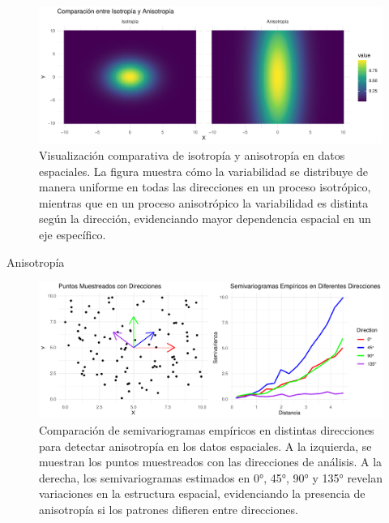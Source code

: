 \documentclass[
  10pt,
  ignorenonframetext,
]{beamer}
\begin{document}
\begin{frame}
\begin{figure}

{\centering \includegraphics{imagenes/anisotropia-1} 

}

\caption{Visualización comparativa de isotropía y anisotropía en datos espaciales. La figura muestra cómo la variabilidad se distribuye de manera uniforme en todas las direcciones en un proceso isotrópico, mientras que en un proceso anisotrópico la variabilidad es distinta según la dirección, evidenciando mayor dependencia espacial en un eje específico.}\label{fig:anisotropia}
\end{figure}
\end{frame}

\begin{frame}
\begin{block}{Anisotropía}
\label{anisotropuxeda}
\begin{figure}

{\centering \includegraphics{imagenes/unnamed-chunk-5-1} 

}

\caption{Comparación de semivariogramas empíricos en distintas direcciones para detectar anisotropía en los datos espaciales. A la izquierda, se muestran los puntos muestreados con las direcciones de análisis. A la derecha, los semivariogramas estimados en 0°, 45°, 90° y 135° revelan variaciones en la estructura espacial, evidenciando la presencia de anisotropía si los patrones difieren entre direcciones.}\label{fig:unnamed-chunk-5}
\end{figure}
\end{block}
\end{frame}
\end{document}
